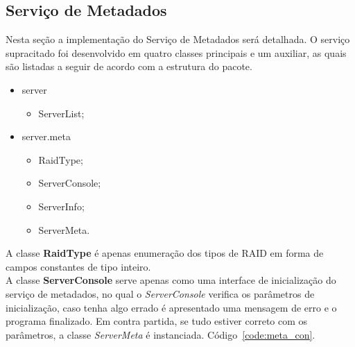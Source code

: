 


\subsection{Serviço de Metadados}
Nesta seção a implementação do Serviço de Metadados será detalhada. O serviço supracitado foi desenvolvido em quatro classes principais e um auxiliar, as quais são listadas a seguir de acordo com  a estrutura do pacote.
\\

\begin{itemize}
	
	\item server
	\begin{itemize}
		\item ServerList;
	\end{itemize}
	\item server.meta
	\begin{itemize}
		\item RaidType;
		\item ServerConsole;
		\item ServerInfo;
		\item ServerMeta.
	\end{itemize}

\end{itemize}

A classe \textbf{RaidType} é apenas enumeração dos tipos de RAID em forma de campos constantes de tipo inteiro.
\\

A classe \textbf{ServerConsole} serve apenas como uma interface de inicialização do serviço de metadados, no qual o \textit{ServerConsole} verifica os parâmetros de inicialização, caso tenha algo errado é apresentado uma mensagem de erro e o programa finalizado. Em contra partida, se tudo estiver correto com os parâmetros, a classe \textit{ServerMeta} é instanciada.
Código~\ref{code:meta_con}.
\\

